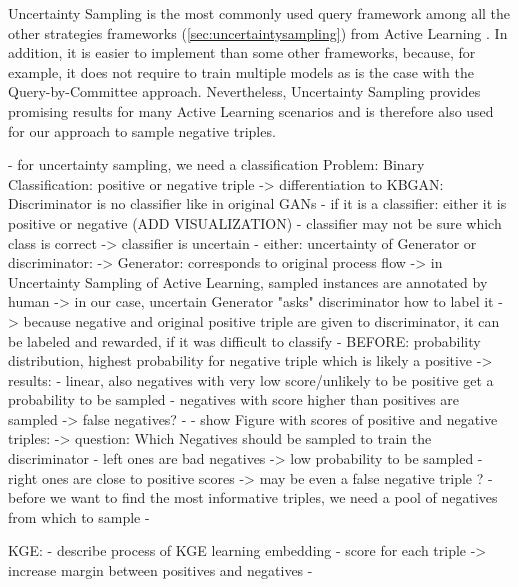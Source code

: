 



Uncertainty Sampling is the most commonly used query framework among all the other strategies frameworks (\autoref{sec:uncertaintysampling}) from Active Learning \cite{Settles2009ActiveLL}.
In addition, it is easier to implement than some other frameworks, because, for example, it does not require to train multiple models as is the case with the Query-by-Committee approach.
Nevertheless, Uncertainty Sampling provides promising results for many Active Learning scenarios and is therefore also used for our approach to sample negative triples.



- for uncertainty sampling, we need a classification Problem: Binary Classification: positive or negative triple
-> differentiation to KBGAN: Discriminator is no classifier like in original GANs
- if it is a classifier: either it is positive or negative (ADD VISUALIZATION)
- classifier may not be sure which class is correct -> classifier is uncertain
- either: uncertainty of Generator or discriminator:
-> Generator: corresponds to original process flow
-> in Uncertainty Sampling of Active Learning, sampled instances are annotated by human
-> in our case, uncertain Generator "asks" discriminator how to label it
-> because negative and original positive triple are given to discriminator, it can be labeled and rewarded, if it was difficult to classify
- BEFORE: probability distribution, highest probability for negative triple which is likely a positive
-> results: 
    - linear, also negatives with very low score/unlikely to be positive get a probability to be sampled 
    - negatives with score higher than positives are sampled -> false negatives?
    - 
- show Figure with scores of positive and negative triples:
-> question: Which Negatives should be sampled to train the discriminator
- left ones are bad negatives -> low probability to be sampled
- right ones are close to positive scores -> may be even a false negative triple ?
- before we want to find the most informative triples, we need a pool of negatives from which to sample
-  
    
KGE: 
- describe process of KGE learning embedding
- score for each triple -> increase margin between positives and negatives
- 

